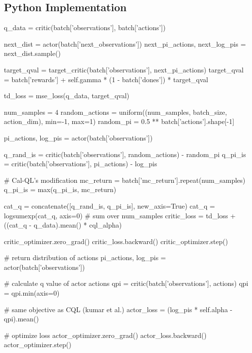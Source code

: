 \subsection{Python Implementation}
\label{app:calql_algo}
\vspace{-0.1cm}
\begin{python}[caption={Training Q networks given a batch of data}]
q_data = critic(batch['observations'], batch['actions'])

next_dist = actor(batch['next_observations'])
next_pi_actions, next_log_pis = next_dist.sample()

target_qval = target_critic(batch['observations'], next_pi_actions)
target_qval = batch['rewards'] + self.gamma * (1 - batch['dones']) * target_qval

td_loss = mse_loss(q_data, target_qval)

num_samples = 4
random_actions = uniform((num_samples, batch_size, action_dim), min=-1, max=1)
random_pi = 0.5 ** batch['actions'].shape[-1]

pi_actions, log_pis = actor(batch['observations'])

q_rand_is = critic(batch['observations'], random_actions) - random_pi
q_pi_is = critic(batch['observations'], pi_actions) - log_pis

# Cal-QL's modification
mc_return = batch['mc_return'].repeat(num_samples)
q_pi_is = max(q_pi_is, mc_return)

cat_q = concatenate([q_rand_is, q_pi_is], new_axis=True)
cat_q = logsumexp(cat_q, axis=0) # sum over num_samples
critic_loss = td_loss + ((cat_q - q_data).mean() * cql_alpha)

critic_optimizer.zero_grad()
critic_loss.backward()
critic_optimizer.step()
\end{python}
\newpage
\begin{python}[caption={Training the policy (or the actor) given a batch of data }]
# return distribution of actions
pi_actions, log_pis = actor(batch['observations'])

# calculate q value of actor actions
qpi = critic(batch['observations'], actions)
qpi = qpi.min(axis=0) 

# same objective as CQL (kumar et al.)
actor_loss = (log_pis * self.alpha - qpi).mean()

# optimize loss
actor_optimizer.zero_grad()
actor_loss.backward()
actor_optimizer.step()
\end{python}

